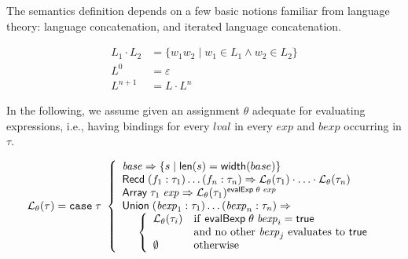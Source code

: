 \documentclass[svgnames]{llncs}
\newcommand{\ie}{i.e.}
\newcommand{\konst}[1]{\ensuremath{\mathsf{#1}}}
\newcommand{\set}[1]{\ensuremath{\{ {#1} \}}}
\newcommand{\LangTheta}[1]{\ensuremath{{\mathcal L}_{\theta}({#1})}}
\begin{document}
The semantics definition depends on a few basic notions familiar from
language theory: language concatenation, and iterated language
concatenation.

\begin{align*}
L_1 \cdot L_2 &= \set{w_1 w_2 \mid w_1 \in L_1 \land w_2 \in  L_2} \\
L^0 &= \varepsilon \\
L^{n+1} &= L \cdot L^n
\end{align*}


\begin{definition}

 In the following, we assume given an assignment $\theta$ adequate for
evaluating expressions, \ie, having bindings for every
$\mathit{lval}$ in every $\mathit{exp}$ and $\mathit{bexp}$
occurring in $\tau$.

\[
\LangTheta{\tau} =
\mathtt{case}\; \tau\
 \left\{
 \begin{array}{l}
 \mathit{base} \Rightarrow \set{s \mid \konst{len}(s) = \konst{width}(base)} \\
 \konst{Recd}\; (f_1 : \tau_1) \ldots (f_n : \tau_n)
      \Rightarrow \LangTheta{\tau_1} \cdot \ldots \cdot \LangTheta{\tau_n}
\\
 \konst{Array}\; \tau_1 \; \mathit{exp}
      \Rightarrow  \LangTheta{\tau_1}^{\konst{evalExp}\;\theta\;\mathit{exp}}
\\
 \konst{Union}\; (\mathit{bexp}_1 : \tau_1) \ldots (\mathit{bexp}_n : \tau_n) \Rightarrow \\
  \hspace*{5mm}
 \left\{
 \begin{array}{ll}
    \LangTheta{\tau_i} &  \mathrm{if}\ \konst{evalBexp}\;\theta\;\mathit{bexp}_i = \konst{true} \\
                  & \mathrm{and\ no\ other}\ \mathit{bexp}_j\ \mathrm{evaluates\ to}\ \konst{true}  \\
    \emptyset & \mathrm{otherwise}
 \end{array}
 \right.
 \\
\end{array}
 \right.
\]
\end{definition}
\end{document}
